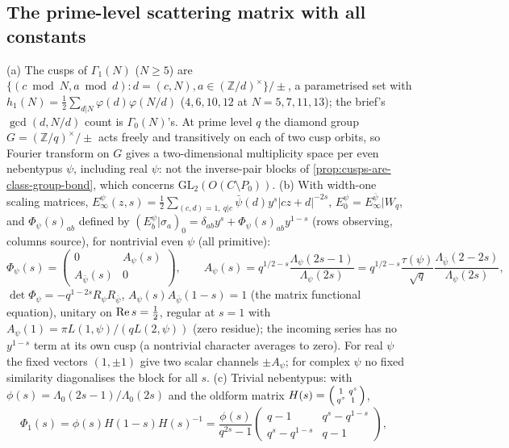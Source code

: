 \subsection{The prime-level scattering matrix with all constants}

\begin{theorem}
\label{thm:prime-level-scattering}
(a) The cusps of $\Gamma_1(N)$ ($N\ge5$) are $\{(c\bmod N,a\bmod d): d = (c,N), a\in(\mathbb Z/d)^\times\}/\pm$, a parametrised set
with $h_1(N) = \tfrac12\sum_{d|N}\varphi(d)\varphi(N/d)$ ($4,6,10,12$ at $N = 5,7,11,13$); the brief's $\gcd(d,N/d)$ count is
$\Gamma_0(N)$'s. At prime level $q$ the diamond group $G = (\mathbb Z/q)^\times/\pm$ acts freely and transitively on each of two cusp
orbits, so Fourier transform on $G$ gives a two-dimensional multiplicity space per even nebentypus $\psi$, including real
$\psi$: not the inverse-pair blocks of \cref{prop:cusps-are-class-group-bond}, which concerns $\mathrm{GL}_2(O(C\setminus P_0))$.
(b) With width-one scaling matrices, $E^\psi_\infty(z,s) = \tfrac12\sum_{(c,d) = 1,\ q|c}\bar\psi(d)y^s|cz+d|^{-2s}$,
$E^\psi_0 = E^{\bar\psi}_\infty|W_q$, and $\Phi_\psi(s)_{ab}$ defined by $(E^\psi_b|\sigma_a)_0 = \delta_{ab}y^s+\Phi_\psi(s)_{ab}y^{1-s}$
(rows observing, columns source), for nontrivial even $\psi$ (all primitive):
\[
\Phi_\psi(s) = \begin{pmatrix}0&A_\psi(s)\\A_{\bar\psi}(s)&0\end{pmatrix},\qquad
A_\psi(s) = q^{1/2-s}\frac{\Lambda_\psi(2s-1)}{\Lambda_\psi(2s)} = q^{1/2-s}\frac{\tau(\psi)}{\sqrt q}\frac{\Lambda_{\bar\psi}(2-2s)}{\Lambda_\psi(2s)},
\]
$\det\Phi_\psi = -q^{1-2s}R_\psi R_{\bar\psi}$, $A_\psi(s)A_{\bar\psi}(1-s) = 1$ (the matrix functional equation), unitary on
$\operatorname{Re} s = \tfrac12$, regular at $s = 1$ with $A_\psi(1) = \pi L(1,\psi)/(qL(2,\psi))$ (zero residue); the incoming series has no
$y^{1-s}$ term at its own cusp (a nontrivial character averages to zero). For real $\psi$ the fixed vectors $(1,\pm1)$ give
two scalar channels $\pm A_\psi$; for complex $\psi$ no fixed similarity diagonalises the block for all $s$. (c) Trivial
nebentypus: with $\phi(s) = \Lambda_0(2s-1)/\Lambda_0(2s)$ and the oldform matrix $H(s) = \begin{psmallmatrix}1&q^s\\q^s&1\end{psmallmatrix}$,
\[
\Phi_1(s) = \phi(s)H(1-s)H(s)^{-1} = \frac{\phi(s)}{q^{2s}-1}\begin{pmatrix}q-1&q^s-q^{1-s}\\q^s-q^{1-s}&q-1\end{pmatrix},\quad
\]
\end{theorem}
